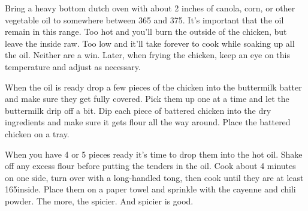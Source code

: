\begin{IngredientsAndSteps}
{        Bring a heavy bottom dutch oven with about 2 inches of canola, corn, or other vegetable oil to somewhere between
        365 and 375\Degrees[F]. It's important that the oil remain in this range. Too hot and you'll burn the outside of the
        chicken, but leave the inside raw. Too low and it'll take forever to cook while soaking up all the oil. Neither
        are a win. Later, when frying the chicken, keep an eye on this temperature and adjust as necessary.

        When the oil is ready drop a few pieces of the chicken into the buttermilk batter and make sure they get fully
        covered. Pick them up one at a time and let the buttermilk drip off a bit. Dip each piece of battered chicken into
        the dry ingredients and make sure it gets flour all the way around. Place the battered chicken on a tray.

        When you have 4 or 5 pieces ready it's time to drop them into the hot oil. Shake off any excess flour before putting
        the tenders in the oil. Cook about 4 minutes on one side, turn over with a long-handled tong, then cook until they are
        at least 165\Degrees[F] inside. Place them on a paper towel and sprinkle with the cayenne and chili powder. The more, the
        spicier. And spicier is good.
    }
\end{IngredientsAndSteps}

%
%
%
%
\newpage



